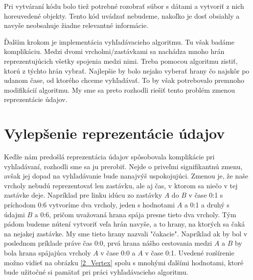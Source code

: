 Pri vytváraní kódu bolo tiež potrebné rozobrať súbor s dátami a vytvoriť z nich horeuvedené objekty. Tento kód uvádzať nebudeme, nakoľko je dosť obsiahly a navyše neobsahuje žiadne relevantné informácie.\newline

Ďalším krokom je implementácia vyhľadávacieho algoritmu. Tu však badáme komplikáciu. Medzi dvomi vrcholmi/zastávkami sa nachádza mnoho hrán reprezentujúcich všetky spojenia medzi nimi. Treba pomocou algoritmu zistiť, ktorú z týchto hrán vybrať. Najlepšie by bolo nejako vyberať hrany čo najskôr po udanom čase, od ktorého chceme vyhľadávať. To by však potrebovalo premnoho modifikácií algoritmu. My sme sa preto rozhodli riešiť tento problém zmenou reprezentácie údajov.\newline


\section{Vylepšenie reprezentácie údajov}

Keďže nám predošlá reprezentácia údajov spôsobovala komplikácie pri vyhľadávaní, rozhodli sme sa ju prerobiť. Nejde o priveľmi signifikantnú zmenu, avšak jej dopad na vyhľadávanie bude nanajvýš uspokojujúci. Zmenou je, že naše vrcholy nebudú reprezentovať len zastávku, ale aj čas, v ktorom sa niečo v tej zastávke deje. Napríklad pre linku idúcu zo zastávky $A$ do $B$ v čase 0:1 s príchodom 0:6 vytvoríme dva vrcholy, jeden s hodnotami $A$ a 0:1 a druhý s údajmi $B$ a 0:6, pričom uvažovaná hrana spája presne tieto dva vrcholy. Tým pádom budeme nútení vytvoriť veľa hrán navyše, a to hrany, na ktorých sa čaká na nejakej zastávke. My sme tieto hrany nazvali "čakacie". Napríklad ak by bol v poslednom príklade práve čas 0:0, prvá hrana nášho cestovania medzi $A$ a $B$ by bola hrana spájajúca vrcholy $A$ v čase 0:0 a $A$ v čase 0:1. Uvedené rozšírenie možno vidieť na obrázku \ref{2_Vertex} spolu s mnohými ďalšími hodnotami, ktoré bude užitočné si pamätať pri práci vyhľadávacieho algoritmu.\newline

